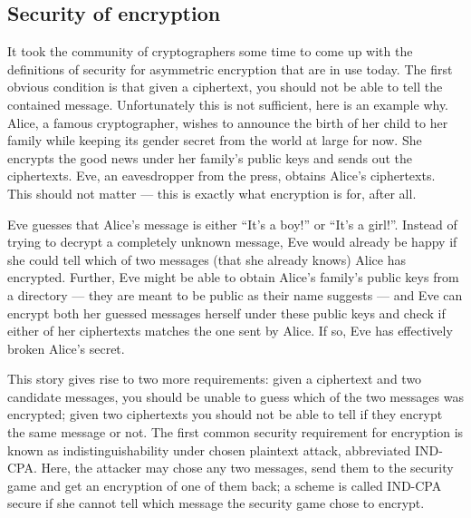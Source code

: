 \documentclass[envcountsame]{llncs}
\begin{document}
\subsection{Security of encryption}

It took the community of cryptographers some time to come up with the
definitions of security for asymmetric encryption that are in use today. The
first obvious condition is that given a ciphertext, you should not be able to
tell the contained message. Unfortunately this is not sufficient, here is an
example why.
Alice, a famous cryptographer, wishes to announce the birth of her child to her family while keeping its gender secret from the world at large for now. She
encrypts the good news under her family's public keys and sends out the
ciphertexts. Eve, an eavesdropper from the press, obtains Alice's ciphertexts.
This should not matter --- this is exactly what encryption is for, after all.

Eve guesses that Alice's message is either ``It's a boy!'' or ``It's a girl!''.
Instead of trying to decrypt a completely unknown message, Eve would already be
happy if she could tell which of two messages (that she already knows) Alice has
encrypted. Further, Eve might be able to obtain Alice's family's public keys
from a directory --- they are meant to be public as their name suggests --- and
Eve can encrypt both her guessed messages herself under these public keys and
check if either of her ciphertexts matches the one sent by Alice. If so, Eve has
effectively broken Alice's secret.

This story gives rise to two more requirements: given a ciphertext and two candidate
messages, you should be unable to guess which of the two messages was encrypted;
given two ciphertexts you should not be able to tell if they encrypt the same
message or not. The first common security requirement for encryption is known as
indistinguishability under chosen plaintext attack, abbreviated IND-CPA. Here,
the attacker may chose any two messages, send them to the security game and get
an encryption of one of them back; a scheme is called IND-CPA secure if she
cannot tell which message the security game chose to encrypt.
\end{document}
